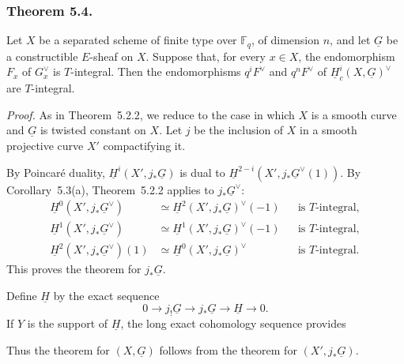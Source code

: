 \subsubsection*{Theorem 5.4.}
Let $X$ be a separated scheme of finite type over $\mathbb F_q$, of
dimension $n$, and let $\underline G$ be a constructible $E$-sheaf on $X$.
Suppose that, for every $x\in X$, the endomorphism $F_x$ of
$G_x^\vee$ is $T$-integral.  Then the endomorphisms $q^iF^\vee$ and
$q^nF^\vee$ of $\underline H_c^i(X,\underline G)^\vee$ are $T$-integral.

\medskip
\noindent\emph{Proof.}
As in Theorem~5.2.2, we reduce to the case in which $X$ is a smooth curve
and $\underline G$ is twisted constant on $X$.  Let $j$ be the inclusion of
$X$ in a smooth projective curve $X'$ compactifying it.

By Poincar\'e duality,
$\underline H^i(X',j_*\underline G)$ is dual to
$\underline H^{2-i}(X',j_*\underline G^\vee(1))$.  By Corollary~5.3(a),
Theorem~5.2.2 applies to $j_*\underline G^\vee$:
\begin{align*}
\underline H^0(X',j_*\underline G^\vee)
  &\simeq \underline H^2(X',j_*\underline G)^\vee(-1)
  &&\text{is \(T\)-integral},\\
\underline H^1(X',j_*\underline G^\vee)
  &\simeq \underline H^1(X',j_*\underline G)^\vee(-1)
  &&\text{is \(T\)-integral},\\
\underline H^2(X',j_*\underline G^\vee)(1)
  &\simeq \underline H^0(X',j_*\underline G)^\vee
  &&\text{is \(T\)-integral}.
\end{align*}
This proves the theorem for $j_*\underline G$.

Define $\underline H$ by the exact sequence
\[
0\longrightarrow j_!\underline G\longrightarrow j_*\underline G
\longrightarrow\underline H\longrightarrow0.
\]
If $Y$ is the support of $\underline H$, the long exact cohomology sequence
provides
\begin{center}
\end{center}
Thus the theorem for $(X,\underline G)$ follows from the theorem for
$(X',j_*\underline G)$.

